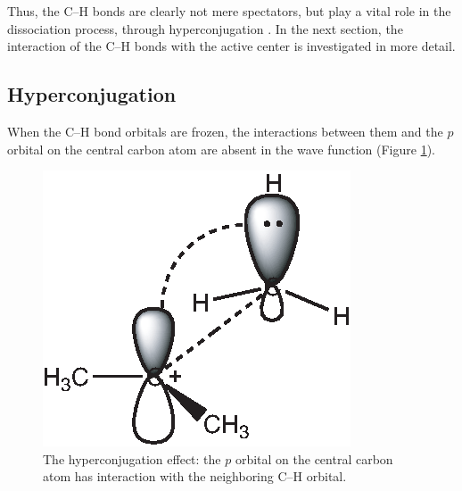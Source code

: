 Thus, the C--H bonds are clearly not mere spectators, but play a vital role in the dissociation process, through hyperconjugation \cite{march,mcmurry}.  In the next section, the interaction of the C--H bonds with the active center is investigated in more detail.

\subsection{Hyperconjugation}

When the C--H bond orbitals are frozen, the interactions between them and the $p$ orbital on the central carbon atom are absent in the wave function (Figure \ref{ch3.fig.hyperconjugation}).
\begin{figure}[ht]
\center
\includegraphics{dissociation/figures/hyperconj.eps}
\caption{The hyperconjugation effect: the $p$ orbital on the central carbon atom has interaction with the neighboring C--H orbital.}
\label{ch3.fig.hyperconjugation}
\end{figure}

